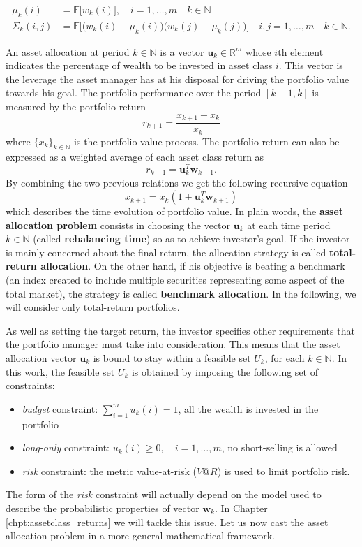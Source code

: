 \begin{align*}
\mu_k(i) & = \mathbb{E}\big[w_k(i)\big], \quad i = 1,\ldots,m \quad k \in \mathbb{N} \\[1.5ex]
\Sigma_k(i,j) &  = \mathbb{E}\bigg[\Big(w_k(i)-\mu_k(i)\Big)\Big(w_k(j)-\mu_k(j)\Big)\bigg] \quad i,j = 1,\ldots,m \quad k \in \mathbb{N}.
\end{align*}

 An asset allocation at period $k \in \mathbb{N}$ is a vector $\bm{u}_k \in \mathbb{R}^m$ whose $i$th element indicates the percentage of wealth to be invested in asset class $i$. This vector is the leverage the asset manager has at his disposal for driving the portfolio value towards his goal. The portfolio performance over the period $[k-1,k]$ is measured by the portfolio return $$r_{k+1}=\frac{x_{k+1}-x_{k}}{x_k}$$ where $\{x_k\}_{k \in \mathbb{N}}$ is the portfolio value process. The portfolio return can also be expressed as a weighted average of each asset class return  as $$ r_{k+1} = \bm{u}_k^T \bm{w}_{k+1}.$$
 By combining the two previous relations we get the following recursive equation 
 \begin{equation}
 \boxed{x_{k+1} = x_k (1 + \bm{u}_k^T \bm{w}_{k+1})}
 \end{equation}
 which describes the time evolution of portfolio value. In plain words, the \textbf{asset allocation problem} consists in choosing the vector $\bm{u}_k$ at each time period $k \in \mathbb{N}$ (called \textbf{rebalancing time}) so as to achieve investor's goal. If the investor is mainly concerned about the final return, the allocation strategy is called \textbf{total-return allocation}. On the other hand, if his objective is beating a benchmark (an index created to include multiple securities representing some aspect of the total market), the strategy is called \textbf{benchmark allocation}. In the following, we will consider only total-return portfolios.
 
 As well as setting the target return, the investor specifies other requirements that the portfolio manager must take into consideration. This means that  the asset allocation vector $\bm{u}_k$ is bound to stay within a feasible set $U_k$, for each $k \in \mathbb{N}$. In this work, the feasible set $U_k$ is obtained by imposing the following set of constraints:
 \begin{itemize}
 	\item \textit{budget} constraint: $\sum_{i=1}^{m}u_k(i)=1$, all the wealth is invested in the portfolio
 	\item \textit{long-only} constraint: $u_k(i) \geq 0,\quad i = 1,\ldots,m$, no short-selling is allowed
 	\item \textit{risk} constraint: the metric value-at-risk ($V@R$) is used to limit portfolio risk. 
 \end{itemize}
The form of the \textit{risk} constraint will actually depend on the model used to describe the probabilistic properties of vector $\bm{w}_k$. In Chapter \ref{chpt:assetclass_returns} we will tackle this issue. Let us now cast the asset allocation problem in a more general mathematical framework.
